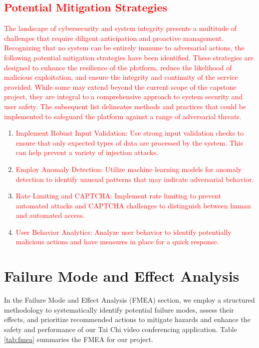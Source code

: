 \documentclass{article}
\begin{document}
\subsection{\textcolor{red}{Potential Mitigation Strategies}}
\textcolor{red}{The landscape of cybersecurity and system integrity presents a multitude of challenges 
that require diligent anticipation and proactive management. Recognizing that no system 
can be entirely immune to adversarial actions, the following potential mitigation strategies 
have been identified. These strategies are designed to enhance the resilience of the platform, 
reduce the likelihood of malicious exploitation, and ensure the integrity and continuity 
of the service provided. While some may extend beyond the current scope of the capstone 
project, they are integral to a comprehensive approach to system security and user safety. 
The subsequent list delineates methods and practices that could be implemented to safeguard 
the platform against a range of adversarial threats.}
\begin{enumerate}
\item \textcolor{red}{Implement Robust Input Validation: Use strong input validation 
checks to ensure that only expected types of data are processed by the system. This 
can help prevent a variety of injection attacks.}
\item \textcolor{red}{Employ Anomaly Detection: Utilize machine learning models for 
anomaly detection to identify unusual patterns that may indicate adversarial behavior.}
\item \textcolor{red}{Rate Limiting and CAPTCHA: Implement rate limiting to prevent 
automated attacks and CAPTCHA challenges to distinguish between human and automated access.}
\item \textcolor{red}{User Behavior Analytics: Analyze user behavior to identify 
potentially malicious actions and have measures in place for a quick response.}
\end{enumerate}
\section{Failure Mode and Effect Analysis}

In the Failure Mode and Effect Analysis (FMEA) section, we employ a structured
methodology to systematically identify potential failure modes, assess their
effects, and prioritize recommended actions to mitigate hazards and enhance the
safety and performance of our Tai Chi video conferencing application. Table
\ref{tab:fmea} summaries the FMEA for our project.
\end{document}
